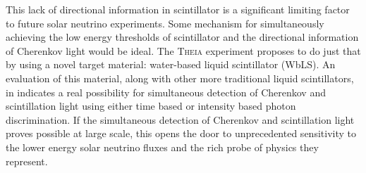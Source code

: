 This lack of directional information in scintillator is a significant limiting factor to future solar neutrino experiments.
Some mechanism for simultaneously achieving the low energy thresholds of scintillator and the directional information of Cherenkov light would be ideal.
The \textsc{Theia} experiment proposes to do just that by using a novel target material: water-based liquid scintillator (WbLS).
An evaluation of this material, along with other more traditional liquid scintillators, in  indicates a real possibility for simultaneous detection of Cherenkov and scintillation light using either time based or intensity based photon discrimination.
If the simultaneous detection of Cherenkov and scintillation light proves possible at large scale, this opens the door to unprecedented sensitivity to the lower energy solar neutrino fluxes and the rich probe of physics they represent.

